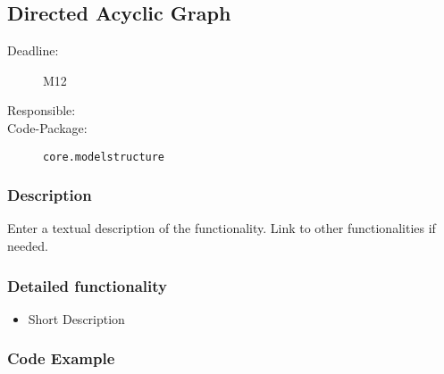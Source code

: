 \newpage
\subsection{Directed Acyclic Graph}
\label{Functionality:ID}

\begin{description}
\item[Deadline:] M12
\item[Responsible:]
\item[Code-Package:] \texttt{core.modelstructure}
\end{description}


\subsubsection*{Description}

Enter a textual description of the functionality. Link to other functionalities if needed. 

\subsubsection*{Detailed functionality}

\begin{itemize}
\item Short Description
\end{itemize}

\subsubsection*{Code Example}



